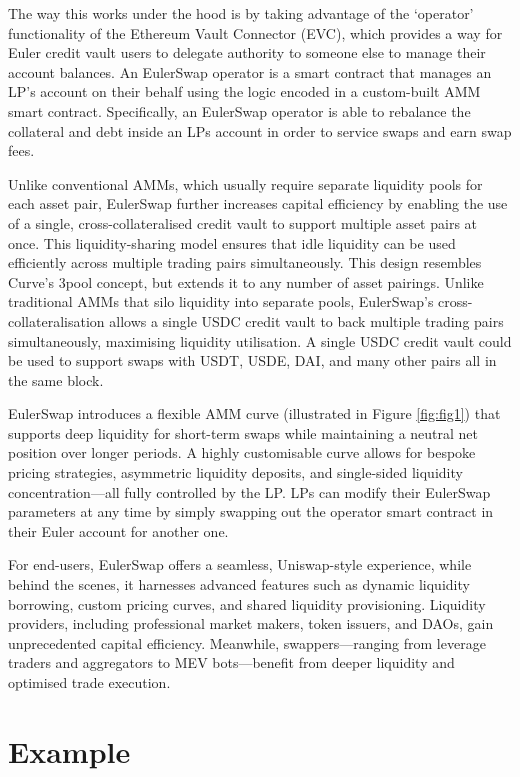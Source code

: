 \documentclass{article}
\begin{document}
The way this works under the hood is by taking advantage of the `operator' functionality of the Ethereum Vault Connector (EVC), which provides a way for Euler credit vault users to delegate authority to someone else to manage their account balances. An EulerSwap operator is a smart contract that manages an LP's account on their behalf using the logic encoded in a custom-built AMM smart contract. Specifically, an EulerSwap operator is able to rebalance the collateral and debt inside an LPs account in order to service swaps and earn swap fees.

Unlike conventional AMMs, which usually require separate liquidity pools for each asset pair, EulerSwap further increases capital efficiency by enabling the use of a single, cross-collateralised credit vault to support multiple asset pairs at once. This liquidity-sharing model ensures that idle liquidity can be used efficiently across multiple trading pairs simultaneously. This design resembles Curve's 3pool concept, but extends it to any number of asset pairings. Unlike traditional AMMs that silo liquidity into separate pools, EulerSwap's cross-collateralisation allows a single USDC credit vault to back multiple trading pairs simultaneously, maximising liquidity utilisation. A single USDC credit vault could be used to support swaps with USDT, USDE, DAI, and many other pairs all in the same block.

EulerSwap introduces a flexible AMM curve (illustrated in Figure \ref{fig:fig1}) that supports deep liquidity for short-term swaps while maintaining a neutral net position over longer periods. A highly customisable curve allows for bespoke pricing strategies, asymmetric liquidity deposits, and single-sided liquidity concentration—all fully controlled by the LP. LPs can modify their EulerSwap parameters at any time by simply swapping out the operator smart contract in their Euler account for another one.

For end-users, EulerSwap offers a seamless, Uniswap-style experience, while behind the scenes, it harnesses advanced features such as dynamic liquidity borrowing, custom pricing curves, and shared liquidity provisioning. Liquidity providers, including professional market makers, token issuers, and DAOs, gain unprecedented capital efficiency. Meanwhile, swappers—ranging from leverage traders and aggregators to MEV bots—benefit from deeper liquidity and optimised trade execution. 

\section{Example}
\end{document}
